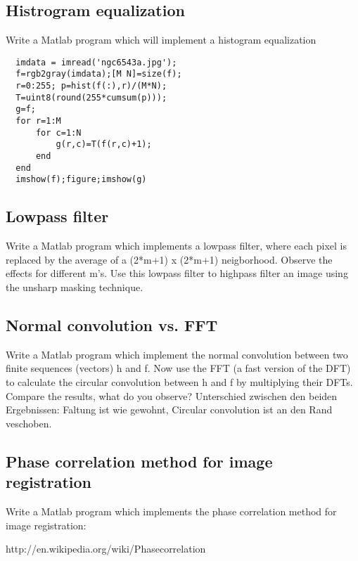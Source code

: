 \subsection{Histrogram equalization}
Write a Matlab program which will implement a histogram equalization
\begin{lstlisting}
  imdata = imread('ngc6543a.jpg');
  f=rgb2gray(imdata);[M N]=size(f);
  r=0:255; p=hist(f(:),r)/(M*N);
  T=uint8(round(255*cumsum(p)));
  g=f;
  for r=1:M
      for c=1:N
          g(r,c)=T(f(r,c)+1);
      end
  end
  imshow(f);figure;imshow(g)
\end{lstlisting}
\subsection{Lowpass filter}
Write a Matlab program which implements a lowpass filter, where each pixel is
replaced by the average of a (2*m+1) x (2*m+1) neigborhood. Observe the effects for different m's. Use this lowpass filter to highpass filter an image using the unsharp masking technique. 
\subsection{Normal convolution vs. FFT}
Write a Matlab program which implement the normal convolution between two finite
sequences (vectors) h and f. Now use the FFT (a fast version of the DFT) to calculate the circular convolution between h and f by multiplying their DFTs. Compare the results, what do you observe?
Unterschied zwischen den beiden Ergebnissen: Faltung ist wie gewohnt, Circular convolution ist an den Rand veschoben.

% 
% 
% 
% 

\subsection{Phase correlation method for image registration}
Write a Matlab program which implements the phase correlation method for image
registration:

http://en.wikipedia.org/wiki/Phase\textunderscore correlation

